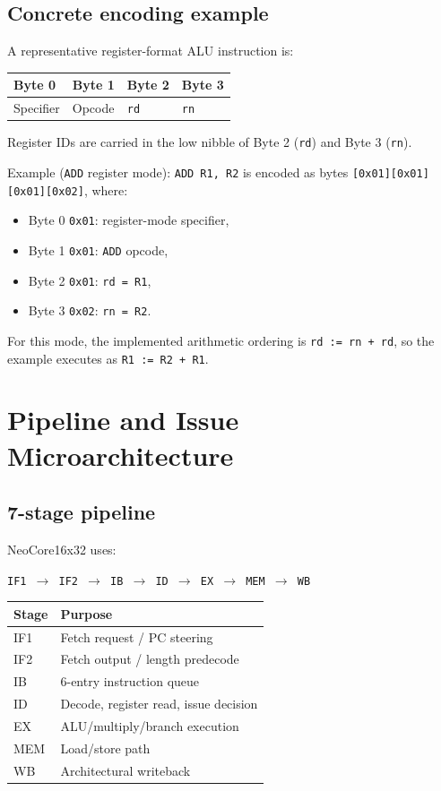 \documentclass[11pt]{article}
\begin{document}
\subsection{Concrete encoding example}
A representative register-format ALU instruction is:
\begin{center}
\begin{tabular}{@{}llll@{}}
\toprule
Byte 0 & Byte 1 & Byte 2 & Byte 3 \\
\midrule
Specifier & Opcode & \texttt{rd} & \texttt{rn} \\
\bottomrule
\end{tabular}
\end{center}

Register IDs are carried in the low nibble of Byte 2 (\texttt{rd}) and Byte 3 (\texttt{rn}).

Example (\texttt{ADD} register mode): \texttt{ADD R1, R2} is encoded as bytes
\texttt{[0x01][0x01][0x01][0x02]}, where:
\begin{itemize}[leftmargin=*]
  \item Byte 0 \texttt{0x01}: register-mode specifier,
  \item Byte 1 \texttt{0x01}: \texttt{ADD} opcode,
  \item Byte 2 \texttt{0x01}: \texttt{rd = R1},
  \item Byte 3 \texttt{0x02}: \texttt{rn = R2}.
\end{itemize}
For this mode, the implemented arithmetic ordering is \texttt{rd := rn + rd}, so the example executes as \texttt{R1 := R2 + R1}.

\section{Pipeline and Issue Microarchitecture}
\subsection{7-stage pipeline}
NeoCore16x32 uses:
\begin{center}
\texttt{IF1 $\rightarrow$ IF2 $\rightarrow$ IB $\rightarrow$ ID $\rightarrow$ EX $\rightarrow$ MEM $\rightarrow$ WB}
\end{center}

\begin{center}
\begin{tabular}{@{}ll@{}}
\toprule
Stage & Purpose \\
\midrule
IF1 & Fetch request / PC steering \\
IF2 & Fetch output / length predecode \\
IB & 6-entry instruction queue \\
ID & Decode, register read, issue decision \\
EX & ALU/multiply/branch execution \\
MEM & Load/store path \\
WB & Architectural writeback \\
\bottomrule
\end{tabular}
\end{center}
\end{document}
